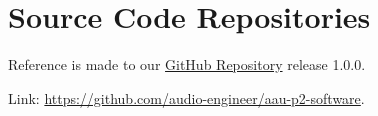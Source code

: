 \chapter{Source Code Repositories}\label{ch:source-code-repositories}

Reference is made to our \href{https://github.com/audio-engineer/aau-p2-software}{GitHub Repository} release 1.0.0.

Link: \url{https://github.com/audio-engineer/aau-p2-software}.
